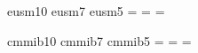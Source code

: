 
\newfam\eusmfam
\font\teneusm       eusm10
\font\seveneusm     eusm7
\font\fiveeusm      eusm5
\textfont\eusmfam=\teneusm
\scriptfont\eusmfam=\seveneusm
\scriptscriptfont\eusmfam=\fiveeusm
\def\eusm{\fam\eusmfam\teneusm}

\newfam\cmmibfam
\font\tencmmib       cmmib10
\font\sevencmmib     cmmib7
\font\fivecmmib      cmmib5
\textfont\cmmibfam=\tencmmib
\scriptfont\cmmibfam=\sevencmmib
\scriptscriptfont\cmmibfam=\fivecmmib
\def\cmmib{\fam\cmmibfam\tencmmib}

\newdimen\ulinedepth {} %
\def\uline#1{{\vtop{\hbox{#1}\skip0 \prevdepth\vskip-\skip0 %
 \vskip\ulinedepth\hrule\vskip-\ulinedepth\vskip\skip0}}}

\newdimen\olineheight \olineheight=6.5pt %
\def\oline{\relax %
  \ifmmode\def\next{\mathpalette\matholine}\else\let\next\makeoline%
  \fi\next}
\def\makeoline#1{\setbox0\hbox{#1}\finoline}
\def\matholine#1#2{\setbox0\hbox{$\mathsurround0pt#1{#2}$}\finoline}
\def\finoline{\ht0=\olineheight\overline{\hbox{\box0}}}

\def\clap#1{\hbox to0pt{\hss#1\hss}}
\def\clapS#1#2{\hbox to#1{\hss#2\hss}}

\def\rlapsup#1{\rlap{${}^{#1}$}}
\def\rlapsub#1{\rlap{${}_{#1}$}}

